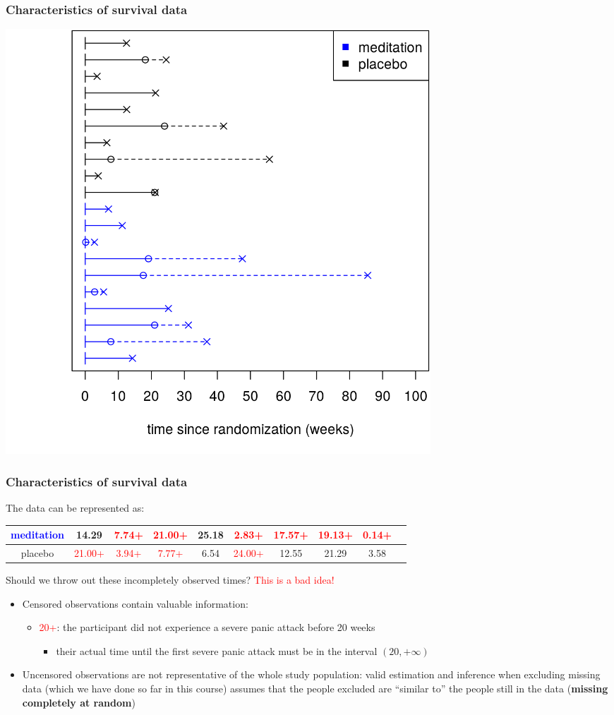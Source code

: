 \documentclass[10pt,t]{beamer}
\begin{document}
\begin{frame}
\frametitle{Characteristics of survival data}
\centering
\includegraphics[width=0.7\textwidth]{figs/meditation_censored_rand_time.png}
\end{frame}

\begin{frame}
\frametitle{Characteristics of survival data}
{\fontsize{6.5pt}{7.2}\selectfont
The data can be represented as:
\begin{tabular}{|c|c|c|c|c|c|c|c|c|c|}
\hline
\textcolor{blue}{meditation} & 14.29  & \textcolor{red}{7.74+} & \textcolor{red}{21.00+} & 25.18  &  \textcolor{red}{2.83+} & \textcolor{red}{17.57+} & \textcolor{red}{19.13+} &  \textcolor{red}{0.14+}  \\
\hline
placebo & \textcolor{red}{21.00+} &  \textcolor{red}{3.94+} &  \textcolor{red}{7.77+} &  6.54  & \textcolor{red}{24.00+} & 12.55  & 21.29 &  3.58 \\
\hline
\end{tabular}
}
\vspace{0.2cm}
Should we throw out these incompletely observed times?  \pause \textcolor{red}{This is a bad idea!}\pause

\begin{itemize}
\item Censored observations contain valuable information: \pause
{\scriptsize
\begin{itemize}
\item \textcolor{red}{20+}: the participant did not experience a severe panic attack before 20 weeks\pause 
\begin{itemize}
	\item their actual time until the first severe panic attack must be in the interval $(20, +\infty)$\pause
\end{itemize}
\end{itemize}
}
\item Uncensored observations are not representative of the whole study population: valid estimation and inference when excluding missing data (which we have done so far in this course) assumes that the people excluded are ``similar to'' the people still in the data (\textbf{missing completely at random})
\end{itemize}

\end{frame}
\end{document}
